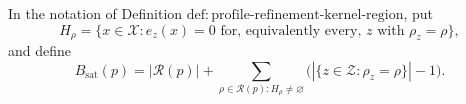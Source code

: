 In the notation of
Definition \(\mathrm{def:profile\text{-}refinement\text{-}kernel\text{-}region}\),
put
\[
 H_\rho=\{x\in\mathcal X:e_z(x)=0\text{ for, equivalently every, }
 z\text{ with }\rho_z=\rho\},
\]
and define
\[
 B_{\mathrm{sat}}(p)
 =|\mathcal R(p)|+
 \sum_{\rho\in\mathcal R(p):H_\rho\ne\varnothing}
 \bigl(|\{z\in\mathcal Z:\rho_z=\rho\}|-1\bigr).
\]